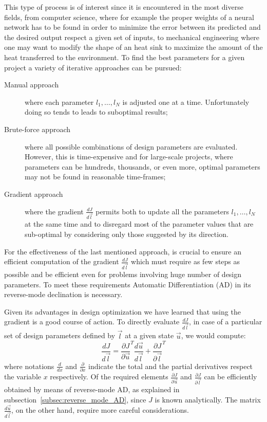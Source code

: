This type of process is of interest since it is encountered in the most diverse fields, from computer science, where for example the proper weights of a neural network has to be found in order to minimize the error between its predicted and the desired output respect a given set of inputs, to mechanical engineering where one may want to modify the shape of an heat sink to maximize the amount of the heat transferred to the environment.
To find the best parameters for a given project a variety of iterative approaches can be pursued:
\begin{description}
	\item[Manual approach] where each parameter $l_1, \dots, l_N$ is adjusted one at a time. Unfortunately doing so tends to leads to suboptimal results;
	\item[Brute-force approach] where all possible combinations of design parameters are evaluated. However, this is time-expensive and for large-scale projects, where parameters can be hundreds, thousands, or even more, optimal parameters may not be found in reasonable time-frames;
	\item[Gradient approach] where the gradient $\frac{dJ}{d\vec{l}}$ permits both to update all the parameters $l_1, \dots, l_N$ at the same time and to disregard most of the parameter values that are sub-optimal by considering only those suggested by its direction.
\end{description}
For the effectiveness of the last mentioned approach, is crucial to ensure an efficient computation of the gradient $\frac{dJ}{d\vec{l}}$ which must require as few steps as possible and be efficient even for problems involving huge number of design parameters. To meet these requirements Automatic Differentiation (AD) in its reverse-mode declination is necessary.

\bigskip
Given its advantages in design optimization we have learned that using the gradient is a good course of action. To directly evaluate $\frac{dJ}{d\vec{l}}$, in case of a particular set of design parameters defined by $\vec{l}$ at a given state $\vec{u}$, we would compute:
\begin{equation}
	\label{eqn:generic_gradient_design_opt}
	\frac{dJ}{d\vec{l}} = \frac{\partial J}{\partial \vec{u}}^T \frac{d\vec{u}}{d\vec{l}} + \frac{\partial J}{\partial \vec{l}}^T
\end{equation}
where notations $\frac{d}{dx}$ and $\frac{\partial}{\partial x}$ indicate the total and the partial derivatives respect the variable $x$ respectively.
Of the required elements $\frac{\partial J}{\partial \vec{u}}$ and $\frac{\partial J}{\partial \vec{l}}$ can be efficiently obtained by means of reverse-mode AD, as explained in subsection~\vref{subsec:reverse_mode_AD}, since $J$ is known analytically. The matrix $\frac{d\vec{u}}{d\vec{l}}$, on the other hand, require more careful considerations.

